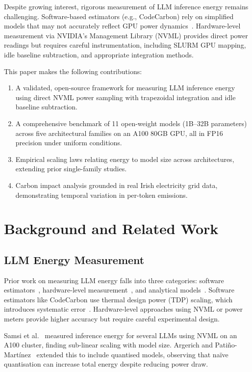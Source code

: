 \documentclass[conference]{IEEEtran}
\begin{document}
Despite growing interest, rigorous measurement of LLM inference energy remains challenging. Software-based estimators (e.g., CodeCarbon) rely on simplified models that may not accurately reflect GPU power dynamics~\cite{jay2023experimental}. Hardware-level measurement via NVIDIA's Management Library (NVML) provides direct power readings but requires careful instrumentation, including SLURM GPU mapping, idle baseline subtraction, and appropriate integration methods.

This paper makes the following contributions:
\begin{enumerate}
    \item A validated, open-source framework for measuring LLM inference energy using direct NVML power sampling with trapezoidal integration and idle baseline subtraction.
    \item A comprehensive benchmark of 11 open-weight models (1B--32B parameters) across five architectural families on an A100 80GB GPU, all in FP16 precision under uniform conditions.
    \item Empirical scaling laws relating energy to model size across architectures, extending prior single-family studies.
    \item Carbon impact analysis grounded in real Irish electricity grid data, demonstrating temporal variation in per-token emissions.
\end{enumerate}

\section{Background and Related Work}

\subsection{LLM Energy Measurement}

Prior work on measuring LLM energy falls into three categories: software estimators~\cite{lacoste2019quantifying, lannelongue2021green}, hardware-level measurement~\cite{samsi2023words, argerich2024measuring}, and analytical models~\cite{desislavov2023trends}. Software estimators like CodeCarbon use thermal design power (TDP) scaling, which introduces systematic error~\cite{jay2023experimental}. Hardware-level approaches using NVML or power meters provide higher accuracy but require careful experimental design.

Samsi et al.~\cite{samsi2023words} measured inference energy for several LLMs using NVML on an A100 cluster, finding sub-linear scaling with model size. Argerich and Pati\~no-Mart\'inez~\cite{argerich2024measuring} extended this to include quantised models, observing that na\"ive quantisation can increase total energy despite reducing power draw.
\end{document}

